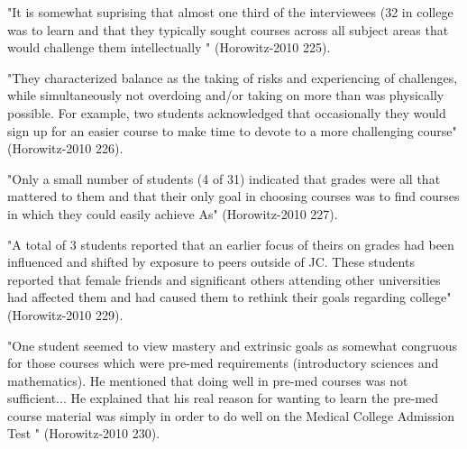 

"It is somewhat suprising that almost
one third of the interviewees (32%
in college was to learn and that they typically sought courses across all subject
areas that would challenge them intellectually " (Horowitz-2010 225).

"They
characterized balance as the taking of risks and experiencing of challenges, while simultaneously not overdoing and/or taking on more than was physically possible. For example, two students acknowledged that occasionally they would sign up for an easier course to make time to devote to a more challenging course" (Horowitz-2010 226).


"Only a small number of students (4 of 31) indicated that grades were all that mattered to them and that their only goal in choosing courses was to find courses in which they could easily achieve As" (Horowitz-2010 227).

"A total of 3 students reported that an earlier focus of theirs on grades had been
influenced and shifted by exposure to peers outside of JC. These students reported
that female friends and significant others attending other universities had affected
them and had caused them to rethink their goals regarding college" (Horowitz-2010 229).

"One student seemed to view mastery and extrinsic goals as somewhat congruous for those courses which were pre-med requirements (introductory sciences and mathematics). He mentioned that doing well in pre-med courses was not sufficient... He explained that his real reason for wanting to learn the pre-med course material was simply in order to do well on the Medical College Admission Test " (Horowitz-2010 230).
